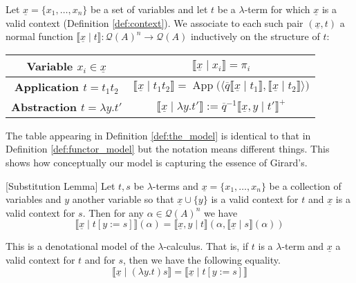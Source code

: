 \documentclass[runningheads]{llncs}
\newcommand{\call}[1]{\mathcal{#1}}
\newcommand{\Qcal}{\call{Q}}
\newcommand{\lto}{\longrightarrow}
\begin{document}
	\begin{definition}\label{def:the_model}
		Let $\underline{x} = \{ x_1, \ldots, x_n \}$ be a set of variables and let $t$ be a $\lambda$-term for which $\underline{x}$ is a valid context (Definition \ref{def:context}). We associate to each such pair $(\underline{x}, t)$ a normal function $\llbracket \underline{x} \mid t \rrbracket: \Qcal(A)^n \lto \Qcal(A)$ inductively on the structure of $t$:
		\begin{center}
			\begin{tabular}{ | c | c | }
			\hline
				\textbf{Variable $x_i \in \underline{x}$} & 
				$\llbracket \underline{x} \mid x_i \rrbracket = \pi_i$\\
				\hline
\textbf{Application $t = t_1 t_2$} & $\llbracket \underline{x} \mid t_1t_2\rrbracket = \operatorname{App}\big( \langle \overline{q} \llbracket \underline{x} \mid t_1 \rrbracket, \llbracket \underline{x} \mid t_2 \rrbracket \rangle \big)$\\
\hline
\textbf{Abstraction $t = \lambda y. t'$} & $\llbracket \underline{x} \mid \lambda y. t' \rrbracket := \overline{q}^{-1} \llbracket \underline{x}, y \mid t' \rrbracket^+$\\
\hline
			\end{tabular}
		\end{center}
	\end{definition}
	\begin{remark}
The table appearing in Definition \ref{def:the_model} is identical to that in Definition \ref{def:functor_model} but the notation means different things. This shows how conceptually our model is capturing the essence of Girard's.
	\end{remark}
	
	\begin{lemma}\label{lem:substitution}[Substitution Lemma]
		Let $t,s$ be $\lambda$-terms and $\underline{x} = \{ x_1, \ldots, x_{n} \}$ be a collection of variables and $y$ another variable so that $\underline{x} \cup \{ y \}$ is a valid context for $t$ and $\underline{x}$ is a valid context for $s$. Then for any $\alpha\in \Qcal(A)^{n}$ we have
		\begin{equation}\label{eq:sub_lem_cond}
			\llbracket \underline{x} \mid t[y := s]\rrbracket(\alpha) = \llbracket \underline{x}, y \mid t \rrbracket(\alpha, \llbracket \underline{x} \mid s \rrbracket (\alpha))
			\end{equation}
		\end{lemma}
	
	\begin{theorem}\label{theorem:denotational_model}
		This is a denotational model of the $\lambda$-calculus. That is, if $t$ is a $\lambda$-term and $\underline{x}$ a valid context for $t$ and for $s$, then we have the following equality.
		\begin{equation}
			\llbracket \underline{x} \mid (\lambda y. t)s\rrbracket = \llbracket \underline{x} \mid t[y:=s]\rrbracket
			\end{equation}
		\end{theorem}
	
\end{document}
